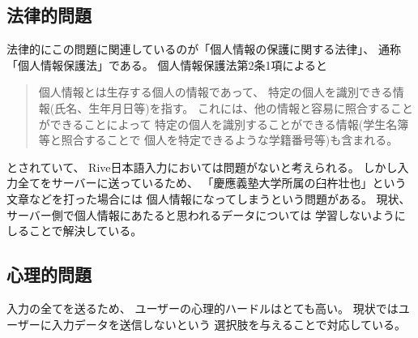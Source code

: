 \subsection{法律的問題}
法律的にこの問題に関連しているのが「個人情報の保護に関する法律」、
通称「個人情報保護法」である。
個人情報保護法第2条1項によると
\begin{quotation}
  個人情報とは生存する個人の情報であって、
  特定の個人を識別できる情報(氏名、生年月日等)を指す。
  これには、他の情報と容易に照合することができることによって
  特定の個人を識別することができる情報(学生名簿等と照合することで
  個人を特定できるような学籍番号等)も含まれる。
\end{quotation}
とされていて、
Rive日本語入力においては問題がないと考えられる。
しかし入力全てをサーバーに送っているため、
「慶應義塾大学所属の臼杵壮也」という文章などを打った場合には
個人情報になってしまうという問題がある。
現状、サーバー側で個人情報にあたると思われるデータについては
学習しないようにしることで解決している。

\subsection{心理的問題}
入力の全てを送るため、
ユーザーの心理的ハードルはとても高い。
現状ではユーザーに入力データを送信しないという
選択肢を与えることで対応している。

